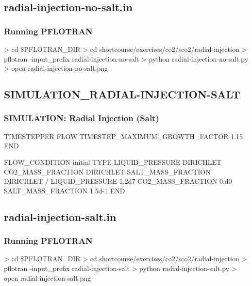 \documentclass{beamer}
\newcommand\greencomment[1]{{{\color{green} #1}}}
\begin{document}
\subsection{radial-injection-no-salt.in}

\begin{frame}[fragile]\frametitle{Running PFLOTRAN}

\begin{semiverbatim}

> cd \$PFLOTRAN_DIR
> cd shortcourse/exercises/co2/sco2/radial-injection
> pflotran -input_prefix radial-injection-no-salt
> python radial-injection-no-salt.py
> open radial-injection-no-salt.png
\end{semiverbatim}

\end{frame}

\subsection{SIMULATION\_RADIAL-INJECTION-SALT}

\begin{frame}\frametitle{SIMULATION: Radial Injection (Salt)}

\begin{semiverbatim}





  TIMESTEPPER FLOW
    TIMESTEP_MAXIMUM_GROWTH_FACTOR 1.15
  END

\newpage
FLOW_CONDITION initial
  TYPE
    LIQUID_PRESSURE DIRICHLET
    CO2_MASS_FRACTION DIRICHLET
    SALT_MASS_FRACTION DIRICHLET
  /
  LIQUID_PRESSURE 1.2d7
  CO2_MASS_FRACTION 0.d0
  \greencomment{SALT_MASS_FRACTION 1.5d-1}
END
\end{semiverbatim}

\end{frame}
\subsection{radial-injection-salt.in}

\begin{frame}[fragile]\frametitle{Running PFLOTRAN}

\begin{semiverbatim}

> cd \$PFLOTRAN_DIR
> cd shortcourse/exercises/co2/sco2/radial-injection
> pflotran -input_prefix radial-injection-salt
> python radial-injection-salt.py
> open radial-injection-salt.png
\end{semiverbatim}

\end{frame}
\end{document}
